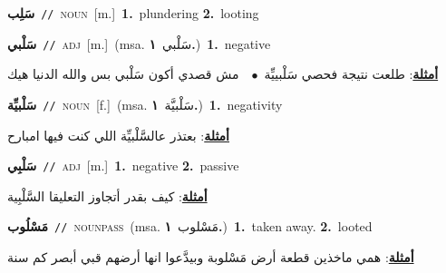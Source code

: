 \documentclass[10pt,a4paper,twoside]{article} %
\begin{document}
\begin{multicols}{2}
{\setlength\topsep{0pt}\textbf{\foreignlanguage{arabic}{سَلِب}}\ {\color{gray}\texttt{//}\color{black}}\ \textsc{noun}\ [m.]\ \textbf{1.}~plundering  \textbf{2.}~looting\ } \vspace{2mm}

{\setlength\topsep{0pt}\textbf{\foreignlanguage{arabic}{سَلْبي}}\ {\color{gray}\texttt{//}\color{black}}\ \textsc{adj}\ [m.]\ \color{gray}(msa. \foreignlanguage{arabic}{سَلْبي}~\foreignlanguage{arabic}{\textbf{١.}})\color{black}\ \textbf{1.}~negative\  \begin{flushright}\color{gray}\foreignlanguage{arabic}{\textbf{\underline{\foreignlanguage{arabic}{أمثلة}}}: طلعت نتيجة فحصي سَلْبييِّة\ $\bullet$\ \  مش قصدي أكون سَلْبي بس والله الدنيا هيك}\end{flushright}\color{black}} \vspace{2mm}

{\setlength\topsep{0pt}\textbf{\foreignlanguage{arabic}{سَلْبيِّة}}\ {\color{gray}\texttt{//}\color{black}}\ \textsc{noun}\ [f.]\ \color{gray}(msa. \foreignlanguage{arabic}{سَلْبيَّة}~\foreignlanguage{arabic}{\textbf{١.}})\color{black}\ \textbf{1.}~negativity\  \begin{flushright}\color{gray}\foreignlanguage{arabic}{\textbf{\underline{\foreignlanguage{arabic}{أمثلة}}}: بعتذر عالسَّلْبيِّة اللي كنت فيها امبارح}\end{flushright}\color{black}} \vspace{2mm}

{\setlength\topsep{0pt}\textbf{\foreignlanguage{arabic}{سَلْبِي}}\ {\color{gray}\texttt{//}\color{black}}\ \textsc{adj}\ [m.]\ \textbf{1.}~negative  \textbf{2.}~passive\  \begin{flushright}\color{gray}\foreignlanguage{arabic}{\textbf{\underline{\foreignlanguage{arabic}{أمثلة}}}: كيف بقدر أتجاوز التعليقا السَّلْبِية}\end{flushright}\color{black}} \vspace{2mm}

{\setlength\topsep{0pt}\textbf{\foreignlanguage{arabic}{مَسْلُوب}}\ {\color{gray}\texttt{//}\color{black}}\ \textsc{noun\textunderscore pass}\ \color{gray}(msa. \foreignlanguage{arabic}{مَسْلوب}~\foreignlanguage{arabic}{\textbf{١.}})\color{black}\ \textbf{1.}~taken away.  \textbf{2.}~looted\  \begin{flushright}\color{gray}\foreignlanguage{arabic}{\textbf{\underline{\foreignlanguage{arabic}{أمثلة}}}: همي ماخذين قطعة أرض مَسْلوبة وبيدَّعوا انها أرضهم قبي أبصر كم سنة}\end{flushright}\color{black}} \vspace{2mm}


\end{multicols}
\end{document}
